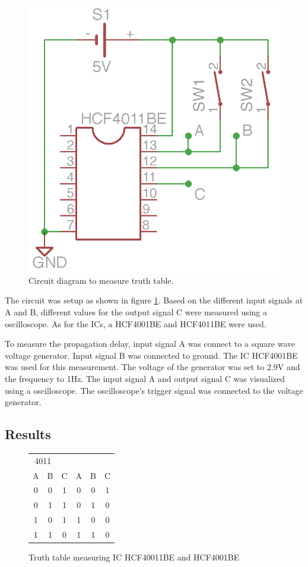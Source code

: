 \documentclass[journal]{IEEEtran}
\begin{document}
\begin{figure}[h!]
  \centering
   \includegraphics[]{boards/truth.png}
   \caption{Circuit diagram to measure truth table.}
   \label{fig:truth_circuit}
\end{figure}

The circuit was setup as shown in figure \ref{fig:truth_circuit}. Based on the
different input signals at A and B, different values for the output signal C
were measured using a oscilloscope. As for the ICs, a HCF4001BE and HCF4011BE
were used.

To measure the propagation delay, input signal A was connect to a square wave
voltage generator. Input signal B was connected to ground. The IC HCF4001BE
was used for this measurement. The voltage of the generator was set to 2.9V and
the frequency to 1Hz. The input signal A and output signal C was visualized
using a oscilloscope. The oscilloscope's trigger signal was connected to the voltage
generator.

\subsection{Results}

\begin{figure}
	\centering
	\begin{tabular}{c c | c || c c | c}
 		 \multicolumn{2}{c}{4011}
  		 \multicolumn{5}{c}{4001} \\
		  A & B & C & A & B & C \\ \hline
		  0 & 0 & 1 & 0 & 0 & 1 \\
		  0 & 1 & 1 & 0 & 1 & 0 \\
		  1 & 0 & 1 & 1 & 0 & 0 \\
		  1 & 1 & 0 & 1 & 1 & 0 \\
	\end{tabular}
	\caption{Truth table measuring IC HCF40011BE and HCF4001BE}
	\label{tab:truthtable} 
\end{figure}
\end{document}
